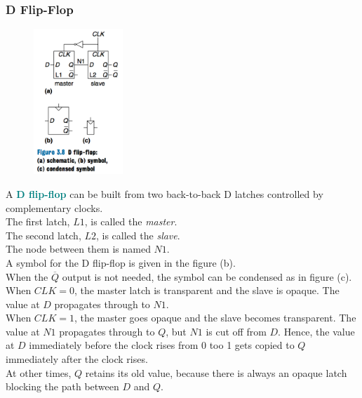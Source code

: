 \documentclass[12pt]{article}
\theoremstyle{definition}
\newcommand{\defnterm}[1]{\textbf{\textcolor{teal}{#1}}\index{#1}}
\begin{document}
  \subsubsection{D Flip-Flop}
  \begin{figure}
    \centering
    \includegraphics[width=0.3\textwidth]{pictures/dFlipFlop.png}
  \end{figure}
  A \defnterm{D flip-flop} can be built from two back-to-back D latches controlled by complementary clocks. \\
  The first latch, $L1$, is called the \emph{master}. \\
  The second latch, $L2$, is called the \emph{slave}. \\
  The node between them is named $N1$. \\
  A symbol for the D flip-flop is given in the figure (b). \\
  When the $\overline{Q}$ output is not needed, the symbol can be condensed as in figure (c). \\

  When $CLK = 0$, the master latch is transparent and the slave is opaque.
  The value at $D$ propagates through to $N1$. \\
  When $CLK = 1$, the master goes opaque and the slave becomes transparent.
  The value at $N1$ propagates through to $Q$, but $N1$ is cut off from $D$.
  Hence, the value at $D$ immediately before the clock rises from 0 too 1 gets copied to $Q$ immediately after the clock rises. \\
  At other times, $Q$ retains its old value, because there is always an opaque latch blocking the path between $D$ and $Q$.
\end{document}
